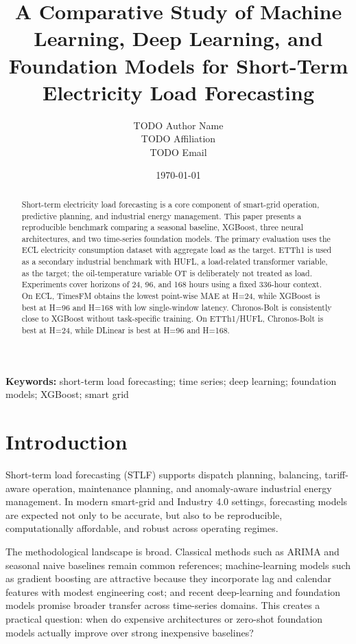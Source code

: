 \documentclass[11pt,a4paper]{article}
\title{A Comparative Study of Machine Learning, Deep Learning, and Foundation Models for Short-Term Electricity Load Forecasting}
\author{TODO Author Name\\TODO Affiliation\\TODO Email}
\date{\today}
\begin{document}
\maketitle
\onehalfspacing

\begin{abstract}
Short-term electricity load forecasting is a core component of smart-grid operation, predictive planning, and industrial energy management. This paper presents a reproducible benchmark comparing a seasonal baseline, XGBoost, three neural architectures, and two time-series foundation models. The primary evaluation uses the ECL electricity consumption dataset with aggregate load as the target. ETTh1 is used as a secondary industrial benchmark with HUFL, a load-related transformer variable, as the target; the oil-temperature variable OT is deliberately not treated as load. Experiments cover horizons of 24, 96, and 168 hours using a fixed 336-hour context. On ECL, TimesFM obtains the lowest point-wise MAE at H=24, while XGBoost is best at H=96 and H=168 with low single-window latency. Chronos-Bolt is consistently close to XGBoost without task-specific training. On ETTh1/HUFL, Chronos-Bolt is best at H=24, while DLinear is best at H=96 and H=168.
\end{abstract}

\textbf{Keywords:} short-term load forecasting; time series; deep learning; foundation models; XGBoost; smart grid

\section{Introduction}
Short-term load forecasting (STLF) supports dispatch planning, balancing, tariff-aware operation, maintenance planning, and anomaly-aware industrial energy management. In modern smart-grid and Industry 4.0 settings, forecasting models are expected not only to be accurate, but also to be reproducible, computationally affordable, and robust across operating regimes.

The methodological landscape is broad. Classical methods such as ARIMA and seasonal naive baselines remain common references; machine-learning models such as gradient boosting are attractive because they incorporate lag and calendar features with modest engineering cost; and recent deep-learning and foundation models promise broader transfer across time-series domains. This creates a practical question: when do expensive architectures or zero-shot foundation models actually improve over strong inexpensive baselines?
\end{document}
